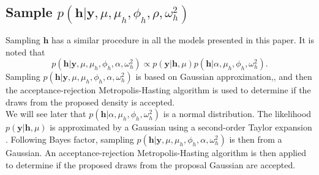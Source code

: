 \documentclass[11pt]{article}
\newcommand{\bbeq}{\begin{equation*}}
\newcommand{\eeeq}{\end{equation*}}
\numberwithin{equation}{section}
\begin{document}
\subsection*{Sample $p(\mathbf{h}|\mathbf{y}, \mu, \mu_h, \phi_h, \rho, \omega^2_h)$}
Sampling $\mathbf{h}$ has a similar procedure in all the models presented in this paper. It is noted that
\bbeq
p(\mathbf{h}|\mathbf{y}, \mu, \mu_h, \phi_h, \alpha, \omega^2_h)\propto p(\mathbf{y}|\mathbf{h}, \mu)p(\mathbf{h}| \alpha, \mu_h, \phi_h, \omega^2_h).
\eeeq 
Sampling $p(\mathbf{h}|\mathbf{y}, \mu, \mu_h, \phi_h, \alpha, \omega^2_h)$ is based on Gaussian approximation,, and then the acceptance-rejection Metropolis-Hasting algorithm is used to determine if the draws from the proposed density is accepted. \\
We will see later that $p(\mathbf{h}| \alpha, \mu_h, \phi_h, \omega^2_h)$ is a normal distribution. The likelihood $p(\mathbf{y}|\mathbf{h}, \mu)$ is approximated by a Gaussian using a second-order Taylor expansion . Following Bayes factor, sampling  $p(\mathbf{h}|\mathbf{y}, \mu, \mu_h, \phi_h, \alpha, \omega^2_h)$ is then from a Gaussian.  An acceptance-rejection Metropolis-Hasting algorithm is then applied to determine if the proposed draws from the proposal Gaussian are accepted.\\
\end{document}
